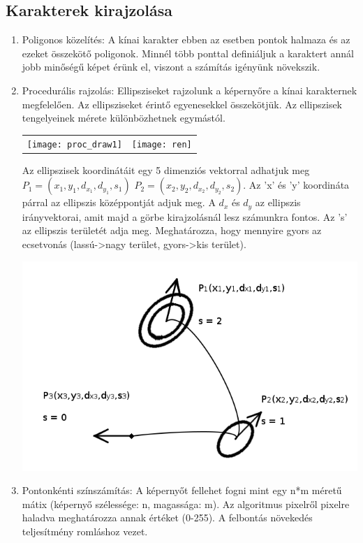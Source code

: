 \subsection{Karakterek kirajzolása}
\begin{enumerate}
\item Poligonos közelítés: A kínai karakter ebben az esetben pontok halmaza és az ezeket összekötő poligonok. Minnél több ponttal definiáljuk a karaktert annál jobb minőségű képet érünk el, viszont a számítás igényünk növekszik.
\item Procedurális rajzolás: Ellipsziseket rajzolunk a képernyőre a kínai karakternek megfelelően. Az ellipsziseket érintő egyenesekkel összekötjük. Az ellipszisek tengelyeinek mérete különbözhetnek egymástól.
\begin{center}
\begin{tabular}{ c c }
\texttt{[image: proc\_draw1]} & \texttt{[image: ren]}
\end{tabular}
\end{center}
Az ellipszisek koordinátáit egy 5 dimenziós vektorral adhatjuk meg \(P_1 = (x_1, y_1, d_{x_1}, d_{y_1}, s_1)\) \(P_2 = (x_2, y_2, d_{x_2}, d_{y_2}, s_2)\). Az 'x' és 'y' koordináta párral az ellipszis középpontját adjuk meg. A $d_x$ és $d_y$ az ellipszis irányvektorai, amit majd a görbe kirajzolásnál lesz számunkra fontos. Az 's' az ellipszis területét adja meg. Meghatározza, hogy mennyire gyors az ecsetvonás (lassú->nagy terület, gyors->kis terület).
\begin{center}
\includegraphics[scale=0.5]{images/proc_draw2}
\end{center}
\item Pontonkénti színszámítás: A képernyőt fellehet fogni mint egy n*m méretű mátix (képernyő szélessége: n, magassága: m). Az algoritmus pixelről pixelre haladva meghatározza annak értéket (0-255). A felbontás növekedés teljesítmény romláshoz vezet.
\end{enumerate}

